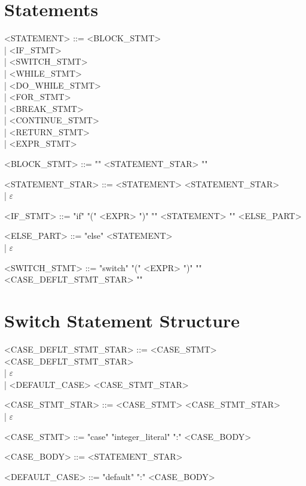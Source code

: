 \section{Statements}
\begin{grammar}
<STATEMENT> ::= <BLOCK\_STMT> \\
              | <IF\_STMT> \\
              | <SWITCH\_STMT> \\
              | <WHILE\_STMT> \\
              | <DO\_WHILE\_STMT> \\
              | <FOR\_STMT> \\
              | <BREAK\_STMT> \\
              | <CONTINUE\_STMT> \\
              | <RETURN\_STMT> \\
              | <EXPR\_STMT>

<BLOCK\_STMT> ::= "{" <STATEMENT\_STAR> "}"

<STATEMENT\_STAR> ::= <STATEMENT> <STATEMENT\_STAR> \\
                   | $\varepsilon$

<IF\_STMT> ::= "if" "(" <EXPR> ")" "{" <STATEMENT> "}" <ELSE\_PART>

<ELSE\_PART> ::= "else" <STATEMENT> \\
               | $\varepsilon$

<SWITCH\_STMT> ::= "switch" "(" <EXPR> ")" "{" <CASE\_DEFLT\_STMT\_STAR> "}"
\end{grammar}

\section{Switch Statement Structure}
\begin{grammar}
<CASE\_DEFLT\_STMT\_STAR> ::= <CASE\_STMT> <CASE\_DEFLT\_STMT\_STAR> \\
                           | $\varepsilon$ \\
                           | <DEFAULT\_CASE> <CASE\_STMT\_STAR>

<CASE\_STMT\_STAR> ::= <CASE\_STMT> <CASE\_STMT\_STAR> \\
                     | $\varepsilon$

<CASE\_STMT> ::= "case" "integer_literal" ":" <CASE\_BODY>

<CASE\_BODY> ::= <STATEMENT\_STAR>

<DEFAULT\_CASE> ::= "default" ":" <CASE\_BODY>
\end{grammar}


